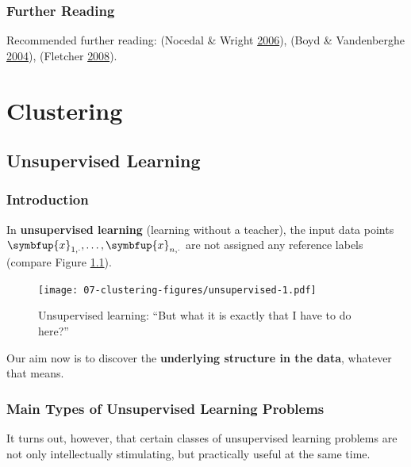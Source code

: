 \documentclass[10pt,b5paper,krantz1]{krantz}
\renewcommand{\mathbf}[1]{\symbfup{#1}}
\begin{document}
\hypertarget{further-reading-5}{%
\subsection{Further Reading}\label{further-reading-5}}

Recommended further reading: (Nocedal \& Wright \protect\hyperlink{ref-nocedal_wright}{2006}), (Boyd \& Vandenberghe \protect\hyperlink{ref-boyd_vandenberghe}{2004}),
(Fletcher \protect\hyperlink{ref-fletcher}{2008}).

\hypertarget{clustering}{%
\chapter{Clustering}\label{clustering}}

\hypertarget{unsupervised-learning}{%
\section{Unsupervised Learning}\label{unsupervised-learning}}

\hypertarget{introduction-12}{%
\subsection{Introduction}\label{introduction-12}}

In \textbf{unsupervised learning} (learning without a teacher),
the input data points \(\mathbf{x}_{1,\cdot},\dots,\mathbf{x}_{n,\cdot}\)
are not assigned any reference labels (compare Figure \ref{fig:unsupervised}).

\begin{figure}
\hypertarget{fig:unsupervised}{%
\centering
\texttt{[image: 07-clustering-figures/unsupervised-1.pdf]}
\caption{Unsupervised learning: ``But what it is exactly that I have to do here?''}\label{fig:unsupervised}
}
\end{figure}

Our aim now is to discover the \textbf{underlying structure in the data},
whatever that means.

\hypertarget{main-types-of-unsupervised-learning-problems}{%
\subsection{Main Types of Unsupervised Learning Problems}\label{main-types-of-unsupervised-learning-problems}}

It turns out, however, that certain classes of unsupervised learning
problems are not only intellectually stimulating,
but practically useful at the same time.
\end{document}
